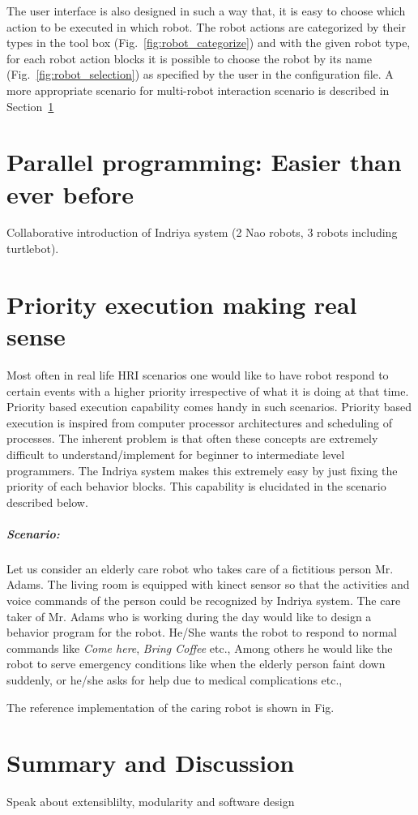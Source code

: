 The user interface is also designed in such a way that, it is easy to choose which action to be executed in which robot. The robot actions are categorized by their types in the tool box (Fig.~\ref{fig:robot_categorize}) and with the given robot type, for each robot action blocks it is possible to choose the robot by its name (Fig.~\ref{fig:robot_selection}) as specified by the user in the configuration file.
A more appropriate scenario for multi-robot interaction scenario is described in Section~\ref{sec:parallel_programming}

\section{Parallel programming: Easier than ever before}
\label{sec:parallel_programming}
Collaborative introduction of Indriya system (2 Nao robots, 3 robots including turtlebot). 

\section{Priority execution making real sense}
Most often in real life HRI scenarios one would like to have robot respond to certain events with a higher priority irrespective of what it is doing at that time. Priority based execution capability comes handy in such scenarios. Priority based execution is inspired from computer processor architectures and scheduling of processes. The inherent problem is that often these concepts are extremely difficult to understand/implement for beginner to intermediate level programmers. The Indriya system makes this extremely easy by just fixing the priority of each behavior blocks. This capability is elucidated in the scenario described below. 

\subparagraph{Scenario:}Let us consider an elderly care robot who takes care of a fictitious person Mr. Adams. The living room is equipped with kinect sensor so that the activities and voice commands of the person could be recognized by Indriya system. The care taker of Mr. Adams who is working during the day would like to design a behavior program for the robot. He/She wants the robot to respond to normal commands like \emph{Come here}, \emph{Bring Coffee} etc., Among others he would like the robot to serve emergency conditions like when the elderly person faint down suddenly, or he/she asks for help due to medical complications etc.,

The reference implementation of the caring robot is shown in Fig.~

\section{Summary and Discussion}

Speak about extensiblilty, modularity and software design